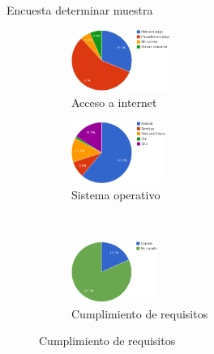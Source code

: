 \begin{frame}{Encuesta determinar muestra}

\begin{figure}
    \begin{subfigure}[b]{.3\linewidth}
        \centering
        \includegraphics[height=2cm]{../resultados/imagenes/ubicacion_acceso_internet.png}
        \caption{Acceso a internet}
    \end{subfigure}\hfill
    \pause{}
    \begin{subfigure}[b]{.3\linewidth}
        \centering
        \includegraphics[height=2cm]{../resultados/imagenes/ubicacion_sistemas_operativos.png}
        \caption{Sistema operativo}
    \end{subfigure}\\
    \pause{}
    \begin{subfigure}[b]{.5\linewidth}
        \centering
        \includegraphics[height=2cm]{../resultados/imagenes/ubicacion_requisitos_minimos.png}
        \caption{Cumplimiento de requisitos}
    \end{subfigure}
\end{figure}

\end{frame}

